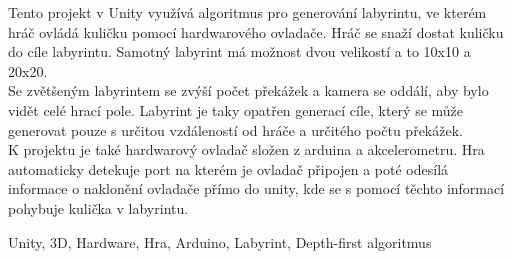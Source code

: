 \documentclass[12pt, a4paper,
twoside        %
]{report}
\begin{document}
	Tento projekt v Unity využívá algoritmus pro generování labyrintu, ve kterém hráč ovládá kuličku pomocí hardwarového ovladače. Hráč se snaží dostat kuličku do cíle labyrintu. Samotný labyrint má možnost dvou velikostí a to 10x10 a 20x20.\\
	Se zvětšeným labyrintem se zvýší počet překážek a kamera se oddálí, aby bylo vidět celé hrací pole. Labyrint je taky opatřen generací cíle, který se může generovat pouze s určitou vzdáleností od hráče a určitého počtu překážek.\\
    K projektu je také hardwarový ovladač složen z arduina a akcelerometru. Hra automaticky detekuje port na kterém je ovladač připojen a poté odesílá informace o naklonění ovladače přímo do unity, kde se s pomocí těchto informací pohybuje kulička v labyrintu.\\
    
	
	\vspace{18pt}
	
	
	\noindent Unity, 3D, Hardware, Hra, Arduino, Labyrint, Depth-first algoritmus
	
	\pagebreak


	
	\tableofcontents %

	\setcounter{page}{1} %

\end{document}
